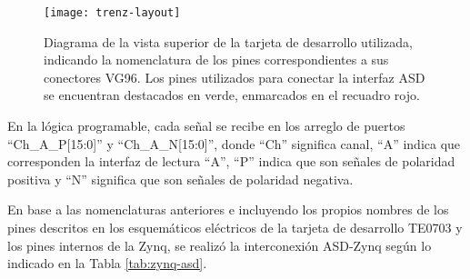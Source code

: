 	\begin{figure}[H]
		\centering
		\texttt{[image: trenz-layout]}
		\caption{Diagrama de la vista superior de la tarjeta de desarrollo utilizada, indicando la nomenclatura de los pines correspondientes a sus conectores VG96. Los pines utilizados para conectar la interfaz ASD se encuentran destacados en verde, enmarcados en el recuadro rojo.}
		\label{fig:trenz-layout}
	\end{figure}
	
	En la lógica programable, cada señal se recibe en los arreglo de puertos ``Ch\_A\_P[15:0]'' y ``Ch\_A\_N[15:0]'', donde ``Ch'' significa canal, ``A'' indica que corresponden la interfaz de lectura ``A'', ``P'' indica que son señales de polaridad positiva y ``N'' significa que son señales de polaridad negativa.
	
	En base a las nomenclaturas anteriores e incluyendo los propios nombres de los pines descritos en los esquemáticos eléctricos de la tarjeta de desarrollo TE0703\cite{TrenzElectronicGmbHTE0703SCH-TE0703-06} y los pines internos de la Zynq, se realizó la interconexión ASD-Zynq según lo indicado en la Tabla \ref{tab:zynq-asd}.
	
